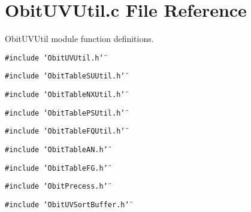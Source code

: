 \section{Obit\-UVUtil.c File Reference}
\label{ObitUVUtil_8c}
Obit\-UVUtil module function definitions. 

{\tt \#include \char`\"{}Obit\-UVUtil.h\char`\"{}}\par
{\tt \#include \char`\"{}Obit\-Table\-SUUtil.h\char`\"{}}\par
{\tt \#include \char`\"{}Obit\-Table\-NXUtil.h\char`\"{}}\par
{\tt \#include \char`\"{}Obit\-Table\-PSUtil.h\char`\"{}}\par
{\tt \#include \char`\"{}Obit\-Table\-FQUtil.h\char`\"{}}\par
{\tt \#include \char`\"{}Obit\-Table\-AN.h\char`\"{}}\par
{\tt \#include \char`\"{}Obit\-Table\-FG.h\char`\"{}}\par
{\tt \#include \char`\"{}Obit\-Precess.h\char`\"{}}\par
{\tt \#include \char`\"{}Obit\-UVSort\-Buffer.h\char`\"{}}\par
